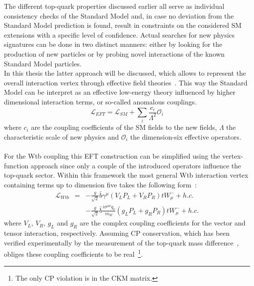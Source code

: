 The different top-quark properties discussed earlier all serve as individual consistency checks of the Standard Model and, in case no deviation from the Standard Model prediction is found, result in constraints on the considered SM extensions with a specific level of confidence.
Actual searches for new physics signatures can be done in two distinct manners: either by looking for the production of new particles or by probing novel interactions of the known Standard Model particles.
\\
In this thesis the latter approach will be discussed, which allows to represent the overall interaction vertex through effective field theories~\cite{EFTOld}. This way the Standard Model can be interpret as an effective low-energy theory influenced by higher dimensional interaction terms, or so-called anomalous couplings.
\begin{equation}
 \mathcal{L}_{EFT} = \mathcal{L}_{SM} + \sum_{i} \frac{c_i}{\Lambda^{2}} \mathcal{O}_i
\end{equation}
where $c_i$ are the coupling coefficients of the SM fields to the new fields, $\Lambda$ the characteristic scale of new physics and $\mathcal{O}_i$ the dimension-six effective operators.
\\
\\
For the Wtb coupling this EFT construction can be simplified using the vertex-function approach since only a couple of the introduced operators influence the top-quark sector.
Within this framework the most general Wtb interaction vertex containing terms up to dimension five takes the following form~\cite{EFTLinkWithWtb, RecentWtbZhang}:
\begin{eqnarray} \label{eq::FullWtbLagr}
  \mathcal{L}_{Wtb} & = & - \frac{g}{\sqrt{2}} \bar{b} \gamma^{\mu} \left( V_L P_L + V_R P_R \right) t W_{\mu}^{-} + h.c. \nonumber \\
		    &   & - \frac{g}{\sqrt{2}} \bar{b} \frac{i\sigma^{\mu \nu} q_{\nu}}{m_{W}} \left( g_L P_L + g_R P_R \right) t W_{\mu}^{-} + h.c.
\end{eqnarray}
where $V_L$, $V_R$, $g_L$ and $g_R$ are the complex coupling coefficients for the vector and tensor interaction, respectively. Assuming CP conservation, which has been verified experimentally by the measurement of the top-quark mass difference~\cite{}, obliges these coupling coefficients to be real~\footnote{The only CP violation is in the CKM matrix.}.
\\


